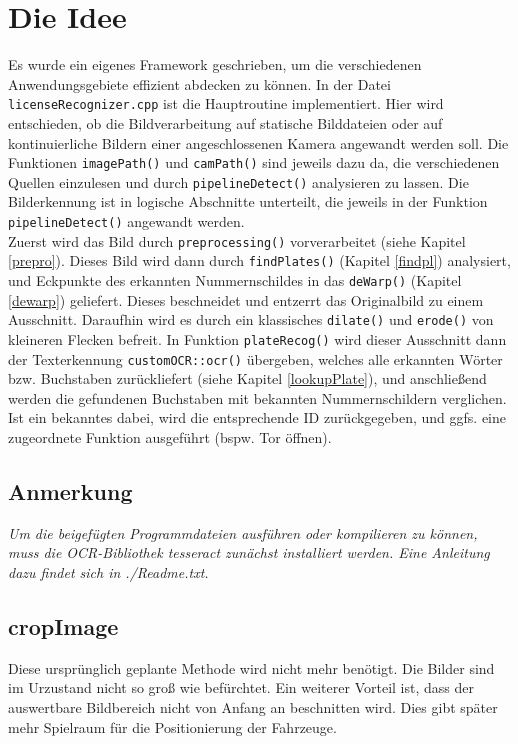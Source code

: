 \documentclass{../Vorlage/sebDenCls}
\begin{document}

\section{Die Idee}
Es wurde ein eigenes Framework geschrieben, um die verschiedenen Anwendungsgebiete effizient abdecken zu können. In der Datei \texttt{licenseRecognizer.cpp} ist die Hauptroutine implementiert.
Hier wird entschieden, ob die Bildverarbeitung auf statische Bilddateien oder auf kontinuierliche Bildern einer angeschlossenen Kamera angewandt werden soll.
Die Funktionen \texttt{imagePath()} und \texttt{camPath()} sind jeweils dazu da, die verschiedenen Quellen einzulesen und durch \texttt{pipelineDetect()} analysieren zu lassen. Die Bilderkennung ist in logische Abschnitte unterteilt, die jeweils in der Funktion \texttt{pipelineDetect()} angewandt werden.\\
Zuerst wird das Bild durch \texttt{preprocessing()} vorverarbeitet (siehe Kapitel \ref{prepro}). Dieses Bild wird dann durch \texttt{findPlates()} (Kapitel \ref{findpl}) analysiert, und Eckpunkte des erkannten Nummernschildes in das \texttt{deWarp()} (Kapitel \ref{dewarp}) geliefert. Dieses beschneidet und entzerrt das Originalbild zu einem Ausschnitt. Daraufhin wird es durch ein klassisches \texttt{dilate()} und \texttt{erode()} von kleineren Flecken befreit. In Funktion \texttt{plateRecog()} wird dieser Ausschnitt dann der Texterkennung \texttt{customOCR::ocr()} übergeben, welches alle erkannten Wörter bzw. Buchstaben zurückliefert (siehe Kapitel \ref{lookupPlate}), und anschließend werden die gefundenen Buchstaben mit bekannten Nummernschildern verglichen. Ist ein bekanntes dabei, wird die entsprechende ID zurückgegeben, und ggfs. eine zugeordnete Funktion ausgeführt (bspw. Tor öffnen).

\subsection{Anmerkung}
\textit{Um die beigefügten Programmdateien ausführen oder kompilieren zu können, muss die OCR-Bibliothek tesseract zunächst installiert werden. Eine Anleitung dazu findet sich in ./Readme.txt.
}

\subsection{cropImage}
Diese ursprünglich geplante Methode wird nicht mehr benötigt. Die Bilder sind im Urzustand nicht so groß wie befürchtet. Ein weiterer Vorteil ist, dass der auswertbare Bildbereich nicht von Anfang an beschnitten wird. Dies gibt später mehr Spielraum für die Positionierung der Fahrzeuge.
\end{document}
